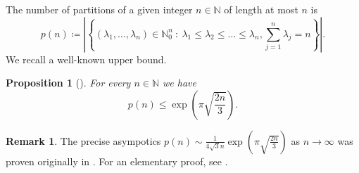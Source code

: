 \documentclass[letterpaper, DIV=17]{scrartcl}
\newtheorem{prop}[theorem]{Proposition}
\numberwithin{equation}{section}
\theoremstyle{definition}
\newtheorem{rem}[theorem]{Remark}
\begin{document}
%
%
		The number of partitions of a given integer $ n \in \mathbb{N} $ of length at most $ n $ is
		\begin{equation} \label{def p(n)}
			p(n) \coloneq \left\vert \left\{ (\lambda_1, \dots, \lambda_n) \in \mathbb{N}_0^n \ : \ \lambda_1\leq \lambda_2 \leq \dots \leq \lambda_n, \sum_{j=1}^n \lambda_j =n\right\} \right\vert.
		\end{equation}
		We recall a well-known upper bound.
		\begin{prop}[\cite{erdos1942elementary}]
			For every $n\in \mathbb{N}$ we have
			\begin{equation} \label{partition function pointwise bound}
				p(n)\leq \exp\left(\pi \sqrt{\frac{2n}{3}}\right) . 
			\end{equation}
		\end{prop}
\begin{rem} The precise asympotics
$ p(n) \sim \frac{1}{4\sqrt{3}n} \exp\left(\pi \sqrt{\frac{2n}{3}}\right) $ as $ n \to \infty $ was proven originally in \cite{hardy1918asymptotic}. For an elementary proof, see \cite{erdos1942elementary}.
\end{rem}
\end{document}
